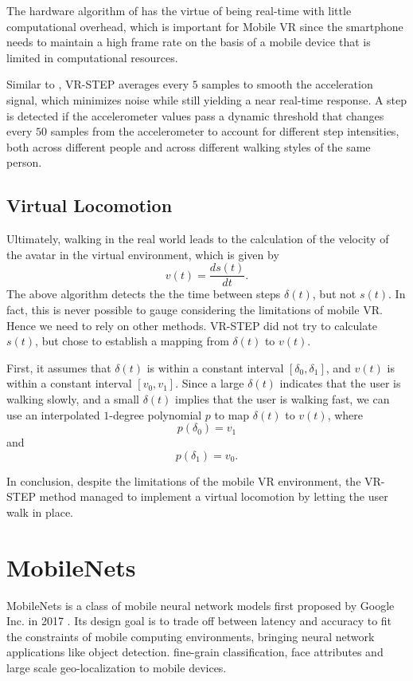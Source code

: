 \documentclass[11pt]{amsart}
\begin{document}
The hardware algorithm of \cite{zhao2010full} has the virtue of being real-time with little computational overhead, which is important for Mobile VR since the smartphone needs to maintain a high frame rate on the basis of a mobile device that is limited in computational resources.

Similar to \cite{zhao2010full}, VR-STEP averages every $5$ samples to smooth the acceleration signal, which minimizes noise while still yielding a near real-time response. A step is detected if the accelerometer values pass a dynamic threshold that changes every $50$ samples from the accelerometer to account for different step intensities, both across different people and across different walking styles of the same person.

\subsection{Virtual Locomotion}
Ultimately, walking in the real world leads to the calculation of the velocity of the avatar in the virtual environment, which is given by\[
v(t)=\frac{ds(t)}{dt}.
\]The above algorithm detects the the time between steps $\delta(t)$, but not $s(t)$. In fact, this is never possible to gauge considering the limitations of mobile VR. Hence we need to rely on other methods. VR-STEP did not try to calculate $s(t)$, but chose to establish a mapping from $\delta(t)$ to $v(t)$.

First, it assumes that $\delta(t)$ is within a constant interval $[\delta_0,\delta_1]$, and $v(t)$ is within a constant interval $[v_0,v_1]$. Since a large $\delta(t)$ indicates that the user is walking slowly, and a small $\delta(t)$ implies that the user is walking fast, we can use an interpolated $1$-degree polynomial $p$ to map $\delta(t)$ to $v(t)$, where\[
p(\delta_0)=v_1
\]and\[
p(\delta_1)=v_0.
\]

In conclusion, despite the limitations of the mobile VR environment, the VR-STEP method managed to implement a virtual locomotion by letting the user walk in place.

\section{MobileNets}
MobileNets is a class of mobile neural network models first proposed by Google Inc. in 2017 \cite{DBLP:journals/corr/HowardZCKWWAA17}. Its design goal is to trade off between latency and accuracy to fit the constraints of mobile computing environments, bringing neural network applications like object detection. fine-grain classification, face attributes and large scale geo-localization to mobile devices.
\end{document}
